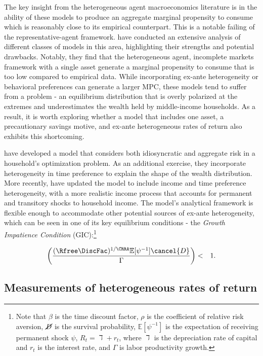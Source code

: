 \documentclass[\econtexRoot/Chp1]{subfiles}
\begin{document}
\par The key insight from the heterogeneous agent macroeconomics literature is in the ability of these models to produce an aggregate marginal propensity to consume which is reasonably close to its empirical counterpart. This is a notable failing of the representative-agent framework. \cite{gkgv22} have conducted an extensive analysis of different classes of models in this area, highlighting their strengths and potential drawbacks. Notably, they find that the heterogeneous agent, incomplete markets framework with a single asset generate a marginal propensity to consume that is too low compared to empirical data. While incorporating ex-ante heterogeneity or behavioral preferences can generate a larger MPC, these models tend to suffer from a  problem - an equilibrium distribution that is overly polarized at the extremes and underestimates the wealth held by middle-income households. As a result, it is worth exploring whether a model that includes one asset, a precautionary savings motive, and ex-ante heterogeneous rates of return also exhibits this shortcoming.

\par  \cite{ks1998} have developed a model that considers both idiosyncratic and aggregate risk in a household's optimization problem. As an additional exercise, they incorporate heterogeneity in time preference to explain the shape of the wealth distribution. More recently, \cite{cstw2017} have updated the model to include income and time preference heterogeneity, with a more realistic income process that accounts for permanent and transitory shocks to household income. The model's analytical framework is flexible enough to accommodate other potential sources of ex-ante heterogeneity, which can be seen in one of its key equilibrium conditions - the \textit{Growth Impatience Condition} (GIC):\footnote{Note that $\beta$ is the time discount factor, $\rho$ is the coefficient of relative risk aversion, $\cancel{D}$ is the survival probability, $\mathbb{E}[\psi^{-1}]$ is the expectation of receiving permanent shock $\psi$, $R_t = \daleth + r_t$, where $\daleth$ is the depreciation rate of capital and $r_t$ is the interest rate, and $\Gamma$ is labor productivity growth.}

\begin{eqnarray*}
\left(\frac{(\Rfree \DiscFac)^{1/\CRRA}\mathbb{E}[\psi^{-1}]\cancel{D}}{\Gamma}\right) & < & 1.
\end{eqnarray*}

\subsection{Measurements of heterogeneous rates of return}
\end{document}

